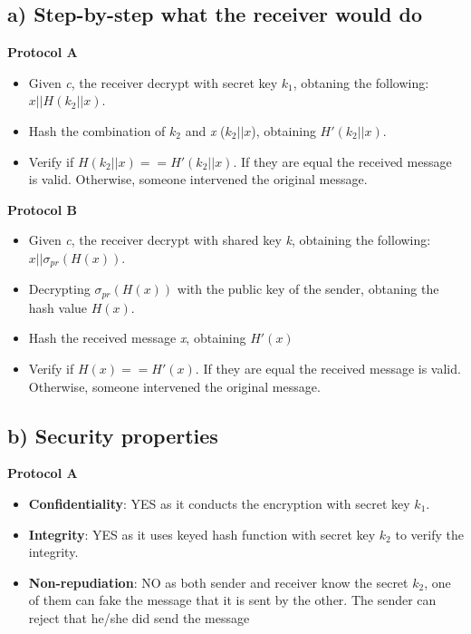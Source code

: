 \subsection*{a) Step-by-step what the receiver would do}
%
\textbf{Protocol A}

\begin{itemize}
    \item Given \emph{c}, the receiver decrypt with secret key \(k_1\),
    obtaning the following: \(x||H(k_2||x)\).
    \item Hash the combination of \(k_2\) and \emph{x} (\(k_2||x\)),
    obtaining \(H'(k_2||x)\).
    \item Verify if \(H(k_2||x) == H'(k_2||x)\). If they are equal the received message
    is valid. Otherwise, someone intervened the original message. 
\end{itemize}

\textbf{Protocol B}

\begin{itemize}
    \item Given \emph{c}, the receiver decrypt with shared key \emph{k},
    obtaining the following: \(x||\sigma_{pr}(H(x))\).
    \item Decrypting \(\sigma_{pr}(H(x))\) with the public key of the sender,
    obtaning the hash value \(H(x)\).
    \item Hash the received message \emph{x}, obtaining \(H'(x)\)
    \item Verify if \(H(x) == H'(x)\). If they are equal the received message
    is valid. Otherwise, someone intervened the original message. 
\end{itemize}

\subsection*{b) Security properties}
%
\textbf{Protocol A}

\begin{itemize}
    \item \textbf{Confidentiality}: YES as it conducts the encryption with secret
    key \(k_1\).
    \item \textbf{Integrity}: YES as it uses keyed hash function with secret key
    \(k_2\) to verify the integrity.
    \item \textbf{Non-repudiation}: NO as both sender and receiver know the secret
    \(k_2\), one of them can fake the message that it is sent by the other. The
    sender can reject that he/she did send the message
\end{itemize}

